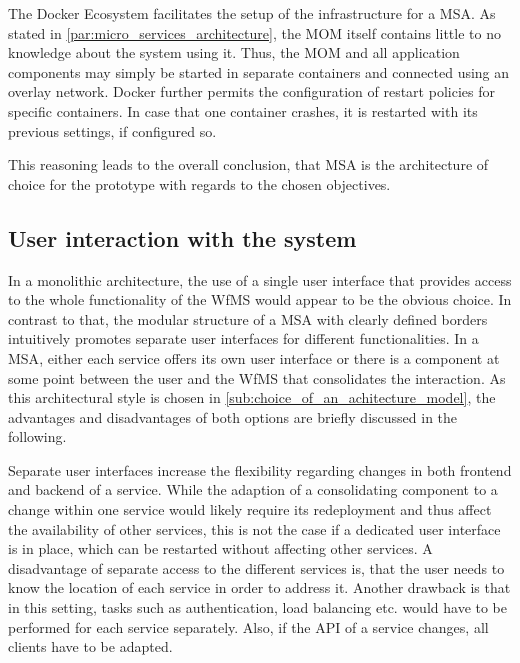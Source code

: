   The Docker Ecosystem facilitates the setup of the infrastructure for a \ac{MSA}. As stated in \ref{par:micro_services_architecture}, the \ac{MOM} itself contains little to no knowledge about the system using it. Thus, the \ac{MOM} and all application components may simply be started in separate containers and connected using an overlay network. Docker further permits the configuration of restart policies for specific containers. In case that one container crashes, it is restarted with its previous settings, if configured so.

  This reasoning leads to the overall conclusion, that \ac{MSA} is the architecture of choice for the prototype with regards to the chosen objectives.

\subsection{User interaction with the system} %
\label{sub:user_interaction_with_the_system}
  In a monolithic architecture, the use of a single user interface that provides access to the whole functionality of the \ac{WfMS} would appear to be the obvious choice.
  In contrast to that, the modular structure of a \ac{MSA} with clearly defined borders intuitively promotes separate user interfaces for different functionalities.
  In a \ac{MSA}, either each service offers its own user interface or there is a component at some point between the user and the \ac{WfMS} that consolidates the interaction. As this architectural style is chosen in \ref{sub:choice_of_an_achitecture_model}, the advantages and disadvantages of both options are briefly discussed in the following.

  Separate user interfaces increase the flexibility regarding changes in both frontend and backend of a service. While the adaption of a consolidating component to a change within one service would likely require its redeployment and thus affect the availability of other services, this is not the case if a dedicated user interface is in place, which can be restarted without affecting other services.
  A disadvantage of separate access to the different services is, that the user needs to know the location of each service in order to address it. Another drawback is that in this setting, tasks such as authentication, load balancing etc. would have to be performed for each service separately. Also, if the \ac{API} of a service changes, all clients have to be adapted.

